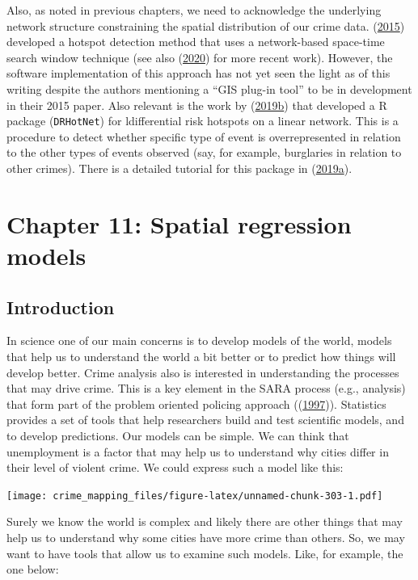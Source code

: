 \documentclass[
  krantz2]{krantz}
\begin{document}
Also, as noted in previous chapters, we need to acknowledge the underlying network structure constraining the spatial distribution of our crime data. (\protect\hyperlink{ref-Shiode_2015}{2015}) developed a hotspot detection method that uses a network-based space-time search window technique (see also (\protect\hyperlink{ref-Shiode_2020}{2020}) for more recent work). However, the software implementation of this approach has not yet seen the light as of this writing despite the authors mentioning a ``GIS plug-in tool'' to be in development in their 2015 paper. Also relevant is the work by (\protect\hyperlink{ref-BrizRedon_2019b}{2019b}) that developed a R package (\texttt{DRHotNet}) for ldifferential risk hotspots on a linear network. This is a procedure to detect whether specific type of event is overrepresented in relation to the other types of events observed (say, for example, burglaries in relation to other crimes). There is a detailed tutorial for this package in (\protect\hyperlink{ref-BrizRedon_2019a}{2019a}).

\hypertarget{chapter-11-spatial-regression-models}{%
\chapter{Chapter 11: Spatial regression models}\label{chapter-11-spatial-regression-models}}

\hypertarget{introduction-9}{%
\section{Introduction}\label{introduction-9}}

In science one of our main concerns is to develop models of the world, models that help us to understand the world a bit better or to predict how things will develop better. Crime analysis also is interested in understanding the processes that may drive crime. This is a key element in the SARA process (e.g., analysis) that form part of the problem oriented policing approach ((\protect\hyperlink{ref-Eck_1997}{1997})). Statistics provides a set of tools that help researchers build and test scientific models, and to develop predictions. Our models can be simple. We can think that unemployment is a factor that may help us to understand why cities differ in their level of violent crime. We could express such a model like this:

\texttt{[image: crime\_mapping\_files/figure-latex/unnamed-chunk-303-1.pdf]}

Surely we know the world is complex and likely there are other things that may help us to understand why some cities have more crime than others. So, we may want to have tools that allow us to examine such models. Like, for example, the one below:
\end{document}
